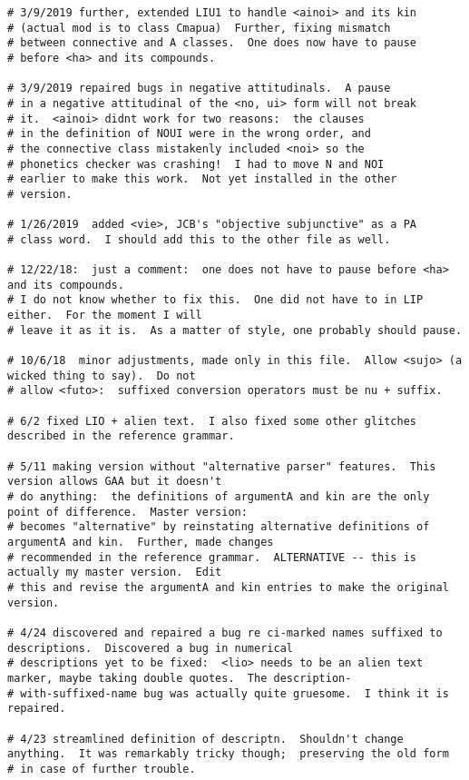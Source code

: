 \documentclass[12pt]{book}
\begin{document}
{\begin{verbatim}
# 3/9/2019 further, extended LIU1 to handle <ainoi> and its kin
# (actual mod is to class Cmapua)  Further, fixing mismatch 
# between connective and A classes.  One does now have to pause
# before <ha> and its compounds.

# 3/9/2019 repaired bugs in negative attitudinals.  A pause
# in a negative attitudinal of the <no, ui> form will not break
# it.  <ainoi> didnt work for two reasons:  the clauses
# in the definition of NOUI were in the wrong order, and
# the connective class mistakenly included <noi> so the 
# phonetics checker was crashing!  I had to move N and NOI 
# earlier to make this work.  Not yet installed in the other 
# version.

# 1/26/2019  added <vie>, JCB's "objective subjunctive" as a PA
# class word.  I should add this to the other file as well.

# 12/22/18:  just a comment:  one does not have to pause before <ha> and its compounds.
# I do not know whether to fix this.  One did not have to in LIP either.  For the moment I will
# leave it as it is.  As a matter of style, one probably should pause.

# 10/6/18  minor adjustments, made only in this file.  Allow <sujo> (a wicked thing to say).  Do not
# allow <futo>:  suffixed conversion operators must be nu + suffix.

# 6/2 fixed LIO + alien text.  I also fixed some other glitches described in the reference grammar.

# 5/11 making version without "alternative parser" features.  This version allows GAA but it doesn't
# do anything:  the definitions of argumentA and kin are the only point of difference.  Master version:
# becomes "alternative" by reinstating alternative definitions of argumentA and kin.  Further, made changes
# recommended in the reference grammar.  ALTERNATIVE -- this is actually my master version.  Edit
# this and revise the argumentA and kin entries to make the original version.

# 4/24 discovered and repaired a bug re ci-marked names suffixed to descriptions.  Discovered a bug in numerical
# descriptions yet to be fixed:  <lio> needs to be an alien text marker, maybe taking double quotes.  The description-
# with-suffixed-name bug was actually quite gruesome.  I think it is repaired.

# 4/23 streamlined definition of descriptn.  Shouldn't change anything.  It was remarkably tricky though;  preserving the old form
# in case of further trouble.


\end{verbatim}}
\end{document}
